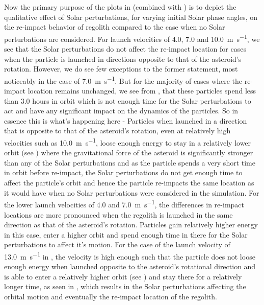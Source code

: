 Now the primary purpose of the plots in  (combined with ) is to depict the qualitative effect of Solar perturbations, for varying initial Solar phase angles, on the re-impact behavior of regolith compared to the case when no Solar perturbations are considered. For launch velocities of 4.0, 7.0 and \SI{10.0}{\metre\per\second}, we see that the Solar perturbations do not affect the re-impact location for cases when the particle is launched in directions opposite to that of the asteroid's rotation. However, we do see few exceptions to the former statement, most noticeably in the case of \SI{7.0}{\metre\per\second}. But for the majority of cases where the re-impact location remains unchanged, we see from , that these particles spend less than 3.0 hours in orbit which is not enough time for the Solar perturbations to act and have any significant impact on the dynamics of the particles. So in essence this is what's happening here - Particles when launched in a direction that is opposite to that of the asteroid's rotation, even at relatively high velocities such as \SI{10.0}{\metre\per\second}, loose enough energy to stay in a relatively lower orbit (see ) where the gravitational force of the asteroid is significantly stronger than any of the Solar perturbations and as the particle spends a very short time in orbit before re-impact, the Solar perturbations do not get enough time to affect the particle's orbit and hence the particle re-impacts the same location as it would have when no Solar perturbations were considered in the simulation. For the lower launch velocities of 4.0 and \SI{7.0}{\metre\per\second}, the differences in re-impact locations are more pronounced when the regolith is launched in the same direction as that of the asteroid's rotation. Particles gain relatively higher energy in this case, enter a higher orbit and spend enough time in there for the Solar perturbations to affect it's motion. For the case of the launch velocity of \SI{13.0}{\metre\per\second} in , the velocity is high enough such that the particle does not loose enough energy when launched opposite to the asteroid's rotational direction and is able to enter a relatively higher orbit (see ) and stay there for a relatively longer time, as seen in , which results in the Solar perturbations affecting the orbital motion and eventually the re-impact location of the regolith.
